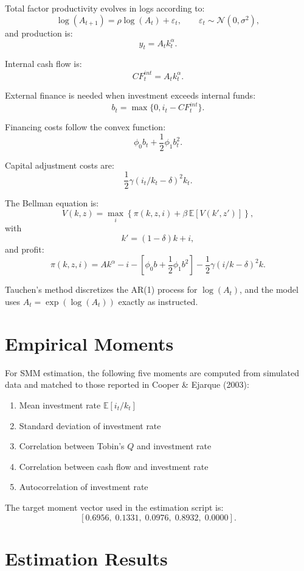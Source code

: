 \documentclass[letterpaper,12pt]{article}
\theoremstyle{definition}
\begin{document}
	Total factor productivity evolves in logs according to:
	\[
	\log(A_{t+1}) = \rho \log(A_t) + \varepsilon_t,
	\qquad \varepsilon_t \sim \mathcal{N}(0, \sigma^2),
	\]
	and production is:
	\[
	y_t = A_t k_t^\alpha .
	\]
	
	Internal cash flow is:
	\[
	CF^{int}_t = A_t k_t^\alpha.
	\]
	
	External finance is needed when investment exceeds internal funds:
	\[
	b_t = \max\{0, i_t - CF^{int}_t\}.
	\]
	
	Financing costs follow the convex function:
	\[
	\phi_0 b_t + \frac{1}{2} \phi_1 b_t^2.
	\]
	
	Capital adjustment costs are:
	\[
	\frac{1}{2} \gamma (i_t/k_t - \delta)^2 k_t.
	\]
	
	The Bellman equation is:
	\[
	V(k,z) = \max_i \left\{ \pi(k,z,i) + \beta \, \mathbb{E}\left[ V(k',z') \right] \right\},
	\]
	with
	\[
	k' = (1-\delta)k + i,
	\]
	and profit:
	\[
	\pi(k,z,i) =
	A k^\alpha - i
	- \left[ \phi_0 b + \frac{1}{2}\phi_1 b^2 \right]
	- \frac{1}{2}\gamma(i/k - \delta)^2 k.
	\]
	
	Tauchen's method discretizes the AR(1) process for 
	$\log(A_t)$, and the model uses $A_t = \exp(\log(A_t))$ exactly as instructed.
	
	\section{Empirical Moments}
	
	For SMM estimation, the following five moments are computed from simulated data 
	and matched to those reported in Cooper \& Ejarque (2003):
	
	\begin{enumerate}
		\item Mean investment rate $\mathbb{E}[i_t / k_t]$
		\item Standard deviation of investment rate
		\item Correlation between Tobin's $Q$ and investment rate
		\item Correlation between cash flow and investment rate
		\item Autocorrelation of investment rate
	\end{enumerate}
	
	The target moment vector used in the estimation script is:
	\[
	\left[
	0.6956,\;
	0.1331,\;
	0.0976,\;
	0.8932,\;
	0.0000
	\right].
	\]
	
	\section{Estimation Results}
	
\end{document}
